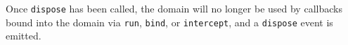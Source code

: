 \begin{Shaded}
\begin{Highlighting}[]
 \NormalTok{- }     
\end{Highlighting}
\end{Shaded}

Once \texttt{dispose} has been called, the domain will no longer be used
by callbacks bound into the domain via \texttt{run}, \texttt{bind}, or
\texttt{intercept}, and a \texttt{dispose} event is emitted.
